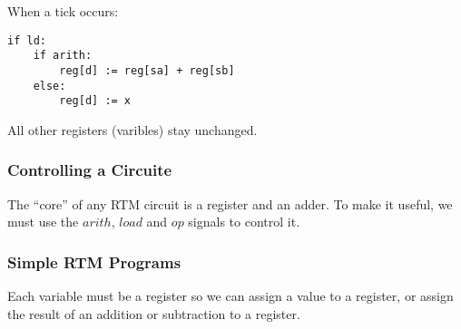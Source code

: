 \noindent
When a tick occurs:
\begin{verbatim}
if ld:
    if arith:
        reg[d] := reg[sa] + reg[sb]
    else:
        reg[d] := x
\end{verbatim}
%
All other registers (varibles) stay unchanged.

\subsubsection{Controlling a Circuite}\label{ssub:controlling_a_circuite}

The ``core'' of any RTM circuit is a register and an adder.
To make it useful, we must use the \(arith\), \(load\) and \(op\) signals to control it.

\subsubsection{Simple RTM Programs}\label{ssub:simple_rtm_programs}

Each variable must be a register so we can assign a value to a register, or assign the result of an addition or subtraction to a register.
